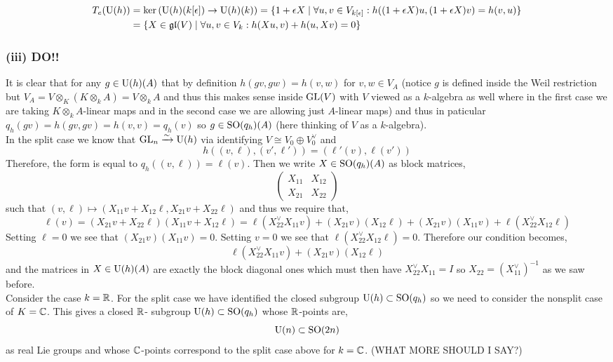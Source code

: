 \documentclass[12pt]{article}
\begin{document}
\begin{align*}
T_e(\mathrm{U}(h)) & = \ker{(\mathrm{U}(h)(k[\epsilon]) \to \mathrm{U}(h)(k))} = \{ 1 + \epsilon X \mid \forall u,v \in V_{k[\epsilon]} : h((1 + \epsilon X)u, (1 + \epsilon X)v) = h(v,u) \}
\\
& = \{ X \in \mathfrak{gl}(V) \mid \forall u,v \in V_k : h(Xu,v) + h(u,Xv) = 0 \}
\end{align*}

\subsubsection{(iii) DO!!}

It is clear that for any $g \in \mathrm{U}(h)(A)$ that by definition $h(gv,gw) = h(v,w)$ for $v,w \in V_A$ (notice $g$ is defined inside the Weil restriction but $V_A = V \otimes_K (K \otimes_k A) = V \otimes_k A$ and thus this makes sense inside $\mathrm{GL}(V)$ with $V$ viewed as a $k$-algebra as well where in the first case we are taking $K \otimes_k A$-linear maps and in the second case we are allowing just $A$-linear maps) and thus in paticular $q_h(gv) = h(gv,gv) = h(v,v) = q_h(v)$ so $g \in \mathrm{SO}(q_h)(A)$ (here thinking of $V$ as a $k$-algebra). 
\bigskip\\
In the split case we know that $\mathrm{GL}_n \xrightarrow{\sim} \mathrm{U}(h)$ via identifying $V \cong V_0 \oplus V_0^\vee$ and 
\[ h((v, \ell), (v', \ell')) = (\ell'(v), \ell(v')) \]
Therefore, the form is equal to $q_h((v, \ell)) = \ell(v)$. Then we write $X \in \mathrm{SO}(q_h)(A)$ as block matrices,
\[ 
\begin{pmatrix}
X_{11} & X_{12}
\\
X_{21} & X_{22}
\end{pmatrix} \]
such that $(v, \ell) \mapsto (X_{11} v + X_{12} \ell, X_{21} v + X_{22} \ell)$ and thus we require that,
\[ \ell(v) = (X_{21} v + X_{22} \ell)(X_{11} v + X_{12} \ell) = \ell(X_{22}^\vee X_{11} v) + (X_{21} v)(X_{12} \ell) + (X_{21} v)(X_{11} v) + \ell(X_{22}^\vee X_{12} \ell)  \]
Setting $\ell = 0$ we see that $(X_{21} v)(X_{11} v) = 0$. Setting $v = 0$ we see that $\ell(X_{22}^\vee X_{12} \ell) = 0$. Therefore our condition becomes,
\[ \ell(X_{22}^\vee X_{11} v) + (X_{21} v)(X_{12} \ell) \]
and the matrices in $X \in \mathrm{U}(h)(A)$ are exactly the block diagonal ones which must then have $X_{22}^\vee X_{11} = I$ so $X_{22} = (X_{11}^\vee)^{-1}$ as we saw before.
\bigskip\\
Consider the case $k = \mathbb{R}$. For the split case we have identified the closed subgroup $\mathrm{U}(h) \subset \mathrm{SO}(q_h)$ so we need to consider the nonsplit case of $K = \mathbb{C}$. This gives a closed $\mathbb{R}$- subgroup $\mathrm{U}(h) \subset \mathrm{SO}(q_h)$ whose $\mathbb{R}$-points are,
\[ \mathrm{U}(n) \subset \mathrm{SO}(2n) \]
as real Lie groups and whose $\mathbb{C}$-points correspond to the split case above for $k = \mathbb{C}$. (WHAT MORE SHOULD I SAY?)
\end{document}
